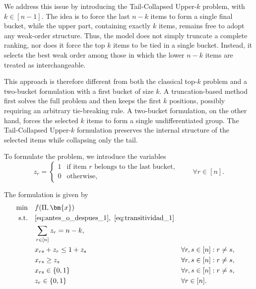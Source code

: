 \documentclass[pdflatex,basic,Numbered]{jnl}%
\theoremstyle{plain}
\theoremstyle{remark}
\theoremstyle{thmstyleone}%
\theoremstyle{thmstylethree}%
\begin{document}
We address this issue by introducing the Tail-Collapsed Upper-\(k\) problem, with \(k \in [n-1]\). The idea is to force the last \(n-k\) items to form a single final bucket, while the upper part, containing exactly \(k\) items, remains free to adopt any weak-order structure. Thus, the model does not simply truncate a complete ranking, nor does it force the top \(k\) items to be tied in a single bucket. Instead, it selects the best weak order among those in which the lower \(n-k\) items are treated as interchangeable.

This approach is therefore different from both the classical top-\(k\) problem and a two-bucket formulation with a first bucket of size \(k\). A truncation-based method first solves the full problem and then keeps the first \(k\) positions, possibly requiring an arbitrary tie-breaking rule. A two-bucket formulation, on the other hand, forces the selected \(k\) items to form a single undifferentiated group. The Tail-Collapsed Upper-\(k\) formulation preserves the internal structure of the selected items while collapsing only the tail.

To formulate the problem, we introduce the variables
\[
z_r=
\begin{cases}
1 & \text{if item } r \text{ belongs to the last bucket},\\
0 & \text{otherwise},
\end{cases}
\qquad \forall r\in[n].
\]

The formulation is given by
\begin{subequations} \label{mod:top-k}
    \begin{align} 
    \min\quad & f(\Pi,\bm{x}) \\
    \text{s.t.}\quad 
        & \eqref{eq:antes_o_despues_1},\ \eqref{eq:transitividad_1} \\
        & \sum_{r\in[n]} z_r = n-k, \label{eq:ultimo_bucket_7} \\
        & x_{rs}+z_r \le 1+z_s
        && \forall r,s\in[n]: r\neq s, \label{eq:ultimo_bucket_empate_7} \\
        & x_{rs}\ge z_s
        && \forall r,s\in[n]: r\neq s, \label{eq:ultimo_bucket_detras_7} \\
        & x_{rs}\in\{0,1\}
        && \forall r,s\in[n]: r\neq s, \label{eq:naturaleza_x_7} \\
        & z_r\in\{0,1\}
        && \forall r\in[n]. \label{eq:naturaleza_z_7}
    \end{align}
\end{subequations}
\end{document}
